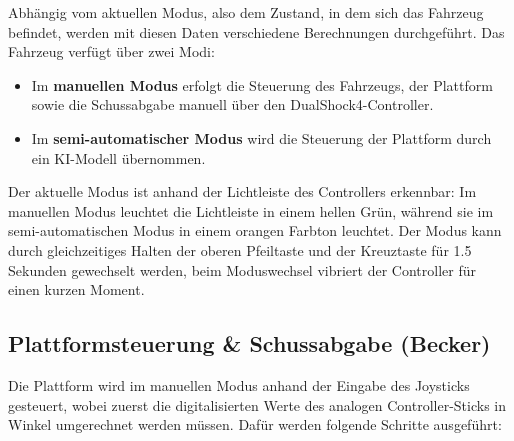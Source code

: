 Abhängig vom aktuellen Modus, also dem Zustand, in dem sich das Fahrzeug befindet, werden mit diesen Daten verschiedene Berechnungen durchgeführt. 
Das Fahrzeug verfügt über zwei Modi:

\begin{itemize}
    \item Im \textbf{manuellen Modus} erfolgt die Steuerung des Fahrzeugs, der Plattform sowie die Schussabgabe manuell über den DualShock4-Controller.
    \item Im \textbf{semi-automatischer Modus} wird die Steuerung der Plattform durch ein KI-Modell übernommen.
\end{itemize}

Der aktuelle Modus ist anhand der Lichtleiste des Controllers erkennbar:
Im manuellen Modus leuchtet die Lichtleiste in einem hellen Grün, während sie im semi-automatischen Modus in einem orangen Farbton leuchtet.
Der Modus kann durch gleichzeitiges Halten der oberen Pfeiltaste und der Kreuztaste für 1.5 Sekunden gewechselt werden, beim Moduswechsel vibriert der Controller für einen kurzen Moment.

\subsection{Plattformsteuerung \& Schussabgabe (Becker)} \label{sec:platform_integration}

Die Plattform wird im manuellen Modus anhand der Eingabe des Joysticks gesteuert, wobei zuerst die digitalisierten Werte des analogen Controller-Sticks in Winkel umgerechnet werden müssen.
Dafür werden folgende Schritte ausgeführt:

